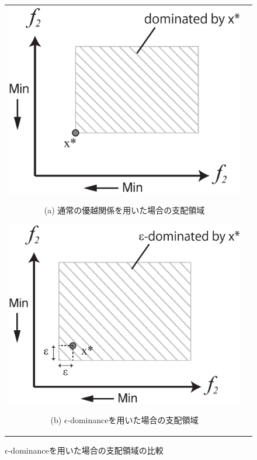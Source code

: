 \documentclass[../main/main]{subfiles}
\begin{document}
\begin{description}
\begin{figure}[htbp]
\begin{tabular}{cc}
\begin{minipage}{0.48\hsize}
\includegraphics[width=0.9\linewidth]{../figures/dominance_image.eps}
\begin{center}
{\footnotesize (a) 通常の優越関係を用いた場合の支配領域}
\end{center}
\end{minipage}
\begin{minipage}{0.49\hsize}
\includegraphics[width=0.9\linewidth]{../figures/epsilon-dominance_image.eps}
\begin{center}
{\footnotesize (b) $\epsilon$-dominanceを用いた場合の支配領域}
\end{center}
\end{minipage}
\end{tabular}
\caption{$\epsilon$-dominanceを用いた場合の支配領域の比較}
\label{epsilon_dominance_image}
\end{figure}


\end{description}
\end{document}
